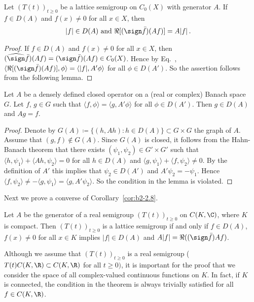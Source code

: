 \begin{corollary}\label{cor:b2-2.8}
Let $(T(t))_{t \geq 0}$ be a lattice semigroup on $C_{0}(X)$ with generator $A$.
If\/ $f \in D(A)$ and $f(x) \neq 0$ for all $x \in X$, then 
\[
|f| \in D(A) \text{ and } \Re[(\sign \bar{f})(Af)] = A|f|\,.
\]
\end{corollary}
\begin{proof}
If\/ $f \in D(A)$ and $f(x) \neq 0$ for all $x \in X$, then $(\widehat{\sign} \bar{f})(Af) = (\sign \bar{f})(Af) \in C_{0}(X)$.
Hence by Eq.~, $\langle \Re[(\sign \bar{f})(Af)],\phi \rangle = \langle |f|,A'\phi \rangle$ for all $\phi \in D(A')$.
So the assertion follows from the following lemma.
\end{proof}

\begin{lemma}\label{lem:b2-2.9}
Let $A$ be a densely defined closed operator on a (real or complex) Banach space $G$.
Let $f$, $g \in G$ such that $\langle f,\phi \rangle = \langle g,A'\phi \rangle$ for all $\phi \in D(A')$.
Then $g \in D(A)$ and $Ag = f$.
\end{lemma}
\begin{proof}
Denote by $G(A) \coloneqq \{(h,Ah) \colon h \in D(A)\} \subset G \times G$ the graph of\/ $A$.
Assume that $(g,f) \notin G(A)$.
Since $G(A)$ is closed, it follows from the Hahn-Banach theorem that there exists $(\psi_{1},\psi_{2}) \in G' \times G'$ such that $\langle h,\psi_{1} \rangle + \langle Ah,\psi_{2} \rangle = 0$ for all $h \in D(A)$ and $\langle g,\psi_{1} \rangle + \langle f,\psi_{2} \rangle \neq 0$.
By the definition of\/ $A'$ this implies that $\psi_{2} \in D(A')$ and $A'\psi_{2} = -\psi_{1}$.
Hence $\langle f,\psi_{2} \rangle \neq -\langle g,\psi_{1} \rangle = \langle g,A'\psi_{2} \rangle$.
So the condition in the lemma is violated.
\end{proof}
Next we prove a converse of Corollary~\ref{cor:b2-2.8}.
\begin{theorem}\label{thm:b2-2.10}
Let $A$ be the generator of a real semigroup $(T(t))_{t \geq 0}$ on $C(K,\C)$, where $K$ is compact.
Then $(T(t))_{t \geq 0}$ is a lattice semigroup if and only if\/ $f \in D(A)$, $f(x) \neq 0$ for all $x \in K$ implies $|f| \in D(A)$ and $A|f| = \Re((\sign \bar{f})Af)$.
\end{theorem}
\begin{remark*}\label{rem:b2-2.10-KGK}
Although we assume that $(T(t))_{t \geq 0}$ is a real semigroup (\ie \\ $T(t)C(K,\R) \subset C(K,\R)$ for all $t \geq 0)$, it is important for the proof that we consider the space of all complex-valued continuous functions on $K$.
In fact, if\/ $K$ is connected, the condition in the theorem is always trivially satisfied for all $f \in C(K,\R)$.
\end{remark*}

